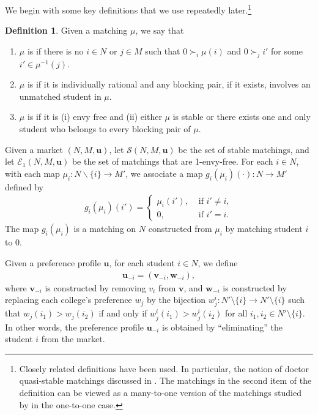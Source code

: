 \documentclass[12pt, fullpage]{amsart}
\theoremstyle{definition}
\newtheorem{definition}{Definition}[section]
\theoremstyle{definition}
\theoremstyle{definition}
\begin{document}
\begin{bibunit}[econometrica]
We begin with some key definitions that we use repeatedly later.\footnote{Closely related definitions have been used. In particular, the notion of doctor quasi-stable matchings discussed in \cite{Wu/Roth:2018:GEB}. The matchings in the second item of the definition can be viewed as a many-to-one version of the matchings studied by \citet{Blum/Rothblum/2002} in the one-to-one case.}
\begin{definition}\label{def:college-envy-free}
	Given a matching $\mu$, we say that 
	\begin{enumerate}
		\item $\mu$ is  if there is no $i\in N$ or $j \in M$ such that $0\succ_{i}\mu(i)$ and $0\succ_{j}i'$ for some $i'\in\mu^{-1}(j)$.
		\item $\mu$ is  if it is individually rational and any blocking pair, if it exists, involves an unmatched student in $\mu$.
		\item $\mu$ is  if it is (i) envy free and (ii) either $\mu$ is stable or there exists one and only student who belongs to every blocking pair of $\mu$. 
	\end{enumerate}
\end{definition}
Given a market $(N,M,\boldsymbol{u})$, let $\mathcal{S}(N,M,\boldsymbol{u})$ be the set of stable matchings, and let $\mathcal{E}_1(N,M,\boldsymbol{u})$ be the set of matchings that are 1-envy-free. For each $i \in N$, with each map $\mu_{i}:N\backslash\{i\}\rightarrow M'$, we associate a map $g_{i}(\mu_{i})(\cdot):N\rightarrow M'$ defined by
\begin{align}
	g_{i}(\mu_{i})(i') = \left\{ \begin{array}{ll}
		\mu_{i}(i'),& \text{ if } i'\neq i,\\
		0,& \text{ if } i' = i.
	\end{array}
	\right.
\end{align}
The map $g_i(\mu_i)$ is a matching on $N$ constructed from $\mu_i$ by matching student $i$ to $0$. 

Given a preference profile $\boldsymbol{u}$, for each student $i \in N$, we define
\begin{align*}
	\boldsymbol{u}_{-i} = (\boldsymbol{v}_{-i},\boldsymbol{w}_{-i}),
\end{align*}
where $\boldsymbol{v}_{-i}$ is constructed by removing $v_i$ from $\boldsymbol{v}$, and $\boldsymbol{w}_{-i}$ is constructed by replacing each college's preference $w_j$ by the bijection $w_j^i: N'\setminus \{i\} \rightarrow N'\setminus \{i\}$ such that $w_j(i_1) > w_j(i_2)$ if and only if $w_j^i(i_1) > w_j^i(i_2)$ for all $i_1,i_2 \in N'\setminus \{i\}$. In other words, the preference profile $\boldsymbol{u}_{-i}$ is obtained by ``eliminating'' the student $i$ from the market.


\end{bibunit}
\end{document}
